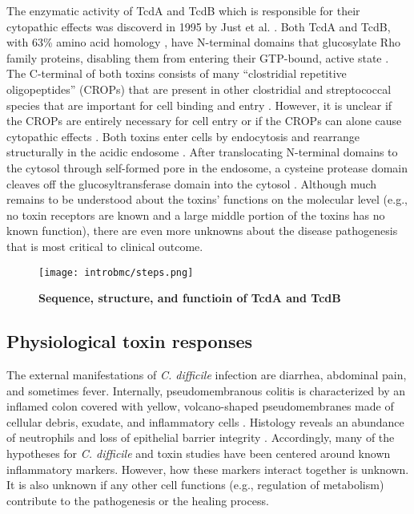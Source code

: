 The enzymatic activity of TcdA and TcdB which is responsible
for their cytopathic effects was discoverd 
in 1995 by Just et al. \cite{Just:1995ei,Just:1995kz}.
Both TcdA and TcdB, with 63\% amino acid
homology \cite{vonEichelStreiber:1992tg}, have N-terminal
domains that glucosylate Rho family proteins, disabling
them from entering their GTP-bound, active state \cite{Just:1995ei,Just:1995kz}.
The C-terminal of both toxins consists of many ``clostridial
repetitive oligopeptides'' (CROPs) that are present in 
other clostridial and streptococcal species 
\cite{vonEichelStreiber:1990ti,vonEichelStreiber:1992vb}
that are important for cell binding and 
entry \cite{Ho:2005vm,Greco:2006wf,Frisch:2003ul}.
However, it is unclear if the CROPs are entirely necessary
for cell entry or if the CROPs can alone cause
cytopathic effects \cite{Yeh:2008hda,Zemljic:2010ub}. Both toxins
enter cells by endocytosis and rearrange structurally
in the acidic endosome \cite{Papatheodorou:2010io,QaDan:2000fj}.
After translocating N-terminal domains to the cytosol through
self-formed pore in the endosome,
a cysteine protease domain cleaves off the glucosyltransferase
domain into the cytosol \cite{Egerer:2007fy,Genisyuerek:2011dr,Pfeifer:2003bx}.
Although much remains to be understood about the 
toxins' functions on the molecular level (e.g., no toxin receptors are known and
a large middle portion of the toxins has no known function), there
are even more unknowns about the disease pathogenesis that
is most critical to clinical outcome.

\begin{figure}[b!]
  \centering
  \texttt{[image: introbmc/steps.png]}
  \caption[Sequence, structure, and functioin of TcdA and TcdB]
  {\textbf{Sequence, structure, and functioin of TcdA and TcdB}}
  \label{introbmc:steps}
\end{figure}

\subsection{Physiological toxin responses}
The external manifestations of \textit{C. difficile} infection 
are diarrhea, abdominal pain, and sometimes fever.
Internally, pseudomembranous colitis is characterized by
an inflamed colon covered with yellow, volcano-shaped 
pseudomembranes made of cellular debris, exudate,
and inflammatory cells \cite{Tedesco:1974jo}. 
Histology reveals an abundance of neutrophils and
loss of epithelial barrier integrity \cite{Lyerly:1988dk,Kelly:1994cu}.
Accordingly, many of the hypotheses for \textit{C. difficile}
and toxin studies have been centered around known inflammatory
markers. However, how these markers interact together
is unknown. It is also unknown if any other cell functions
(e.g., regulation of metabolism) contribute to the pathogenesis
or the healing process.


